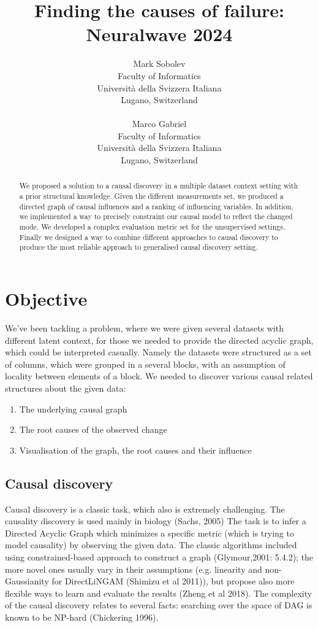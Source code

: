 \documentclass{article}
\title{Finding the causes of failure: Neuralwave 2024}
\author{
	Mark Sobolev\\
	Faculty of Informatics\\
	Università della Svizzera Italiana\\
	Lugano, Switzerland \\
	\\
	\And
	Marco Gabriel \\
	Faculty of Informatics \\
	Università della Svizzera Italiana\\
	Lugano, Switzerland \\
}
\begin{document}
	
	
	\maketitle
	

	\begin{abstract}
		We proposed a solution to a causal discovery in a multiple dataset context setting with a prior structural knowledge. Given the different measurements set, we produced a directed graph of causal influences and a ranking of influencing variables. In addition, we implemented a way to precisely constraint our causal model to reflect the changed mode. We developed a complex evaluation metric set for the unsupervised settings. Finally we designed a way to combine different approaches to causal discovery to produce the most reliable approach to generalised causal discovery setting. 
	\end{abstract}
	
	



	\section{Objective}
	
	We've been tackling a problem, where we were given several datasets with different latent context, for those we needed to provide the directed acyclic graph, which could be interpreted casually. Namely the datasets were structured as a set of columns, which were grouped in a several blocks, with an assumption of locality between elements of a block. We needed to discover various causal related structures about the given data:
	
	\begin{enumerate}
		\item The underlying causal graph
		\item The root causes of the observed change
		\item Visualisation of the graph, the root causes and their influence
	\end{enumerate}
	
	\subsection{Causal discovery}
	
	Causal discovery is a classic task, which also is extremely challenging. The causality discovery is used mainly in biology (Sachs, 2005) The task is to infer a Directed Acyclic Graph which minimizes a specific metric (which is trying to model causality) by observing the given data. The classic algorithms included using constrained-based approach to construct a graph (Glymour,2001: 5.4.2); the more novel ones usually vary in their assumptions (e.g. linearity and non-Gaussianity for DirectLiNGAM (Shimizu et al 2011)), but propose also more flexible ways to learn and evaluate the results (Zheng et al 2018). The complexity of the causal discovery relates to several facts: searching over the space of DAG is known to be NP-hard (Chickering 1996). 
	
\end{document}
